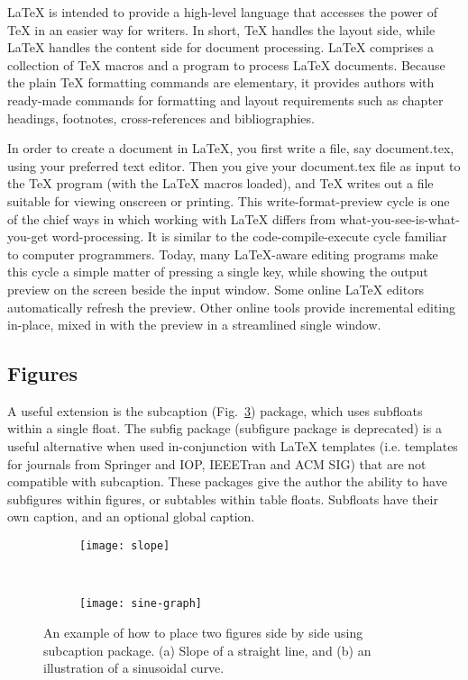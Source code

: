 \documentclass[11pt, a4paper]{article}
\begin{document}
LaTeX is intended to provide a high-level language that accesses the power of TeX in an easier way for writers. In short, TeX handles the layout side, while LaTeX handles the content side for document processing. LaTeX comprises a collection of TeX macros and a program to process LaTeX documents. Because the plain TeX formatting commands are elementary, it provides authors with ready-made commands for formatting and layout requirements such as chapter headings, footnotes, cross-references and bibliographies.

In order to create a document in LaTeX, you first write a file, say document.tex, using your preferred text editor. Then you give your document.tex file as input to the TeX program (with the LaTeX macros loaded), and TeX writes out a file suitable for viewing onscreen or printing. This write-format-preview cycle is one of the chief ways in which working with LaTeX differs from what-you-see-is-what-you-get word-processing. It is similar to the code-compile-execute cycle familiar to computer programmers. Today, many LaTeX-aware editing programs make this cycle a simple matter of pressing a single key, while showing the output preview on the screen beside the input window. Some online LaTeX editors automatically refresh the preview. Other online tools provide incremental editing in-place, mixed in with the preview in a streamlined single window.

\subsection{Figures}
A useful extension is the subcaption (Fig.~\ref{fig:subfigs cap}) package, which uses subfloats within a single float. The subfig package (subfigure package is deprecated) is a useful alternative when used in-conjunction with LaTeX templates (i.e. templates for journals from Springer and IOP, IEEETran and ACM SIG) that are not compatible with subcaption. These packages give the author the ability to have subfigures within figures, or subtables within table floats. Subfloats have their own caption, and an optional global caption.

\begin{figure}
	\centering
	\begin{subfigure}[b]{0.45\linewidth}
		\centering
		\texttt{[image: slope]}
		\caption{}
		\label{fig:slope}
	\end{subfigure}
	~
	\begin{subfigure}[b]{0.45\linewidth}
		\centering
		\texttt{[image: sine-graph]}
		\caption{}
		\label{fig:sine-graph}
	\end{subfigure}
	\caption{An example of how to place two figures side by side using subcaption package. (a) Slope of a straight line, and (b) an illustration of a sinusoidal curve.}
	\label{fig:subfigs cap}
\end{figure}
\end{document}
